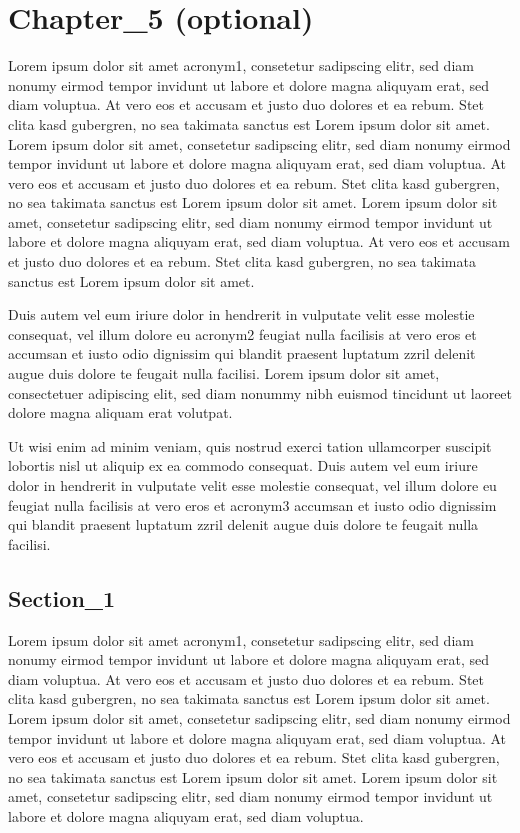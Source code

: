 \chapter{Chapter\_5 (optional)}

Lorem ipsum dolor sit amet \acrfull{acronym1}, consetetur sadipscing elitr, sed diam nonumy eirmod tempor invidunt ut labore et dolore magna aliquyam erat, sed diam voluptua. At vero eos et accusam et justo duo dolores et ea rebum. Stet clita kasd gubergren, no sea takimata sanctus est Lorem ipsum dolor sit amet. Lorem ipsum dolor sit amet, consetetur sadipscing elitr, sed diam nonumy eirmod tempor invidunt ut labore et dolore magna aliquyam erat, sed diam voluptua. At vero eos et accusam et justo duo dolores et ea rebum. Stet clita kasd gubergren, no sea takimata sanctus est Lorem ipsum dolor sit amet. Lorem ipsum dolor sit amet, consetetur sadipscing elitr, sed diam nonumy eirmod tempor invidunt ut labore et dolore magna aliquyam erat, sed diam voluptua. At vero eos et accusam et justo duo dolores et ea rebum. Stet clita kasd gubergren, no sea takimata sanctus est Lorem ipsum dolor sit amet. 

Duis autem vel eum iriure dolor in hendrerit in vulputate velit esse molestie consequat, vel illum dolore eu \acrfull{acronym2} feugiat nulla facilisis at vero eros et accumsan et iusto odio dignissim qui blandit praesent luptatum zzril delenit augue duis dolore te feugait nulla facilisi. Lorem ipsum dolor sit amet, consectetuer adipiscing elit, sed diam nonummy nibh euismod tincidunt ut laoreet dolore magna aliquam erat volutpat. 

Ut wisi enim ad minim veniam, quis nostrud exerci tation ullamcorper suscipit lobortis nisl ut aliquip ex ea commodo consequat. Duis autem vel eum iriure dolor in hendrerit in vulputate velit esse molestie consequat, vel illum dolore eu feugiat nulla facilisis at vero eros et \acrfull{acronym3} accumsan et iusto odio dignissim qui blandit praesent luptatum zzril delenit augue duis dolore te feugait nulla facilisi.

\section{Section\_1}

Lorem ipsum dolor sit amet \acrfull{acronym1}, consetetur sadipscing elitr, sed diam nonumy eirmod tempor invidunt ut labore et dolore magna aliquyam erat, sed diam voluptua. At vero eos et accusam et justo duo dolores et ea rebum. Stet clita kasd gubergren, no sea takimata sanctus est Lorem ipsum dolor sit amet. Lorem ipsum dolor sit amet, consetetur sadipscing elitr, sed diam nonumy eirmod tempor invidunt ut labore et dolore magna aliquyam erat, sed diam voluptua. At vero eos et accusam et justo duo dolores et ea rebum. Stet clita kasd gubergren, no sea takimata sanctus est Lorem ipsum dolor sit amet. Lorem ipsum dolor sit amet, consetetur sadipscing elitr, sed diam nonumy eirmod tempor invidunt ut labore et dolore magna aliquyam erat, sed diam voluptua.

